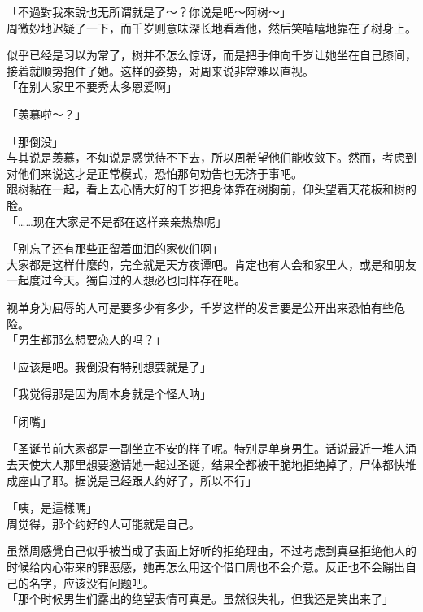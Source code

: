 「不過對我來說也无所谓就是了～？你说是吧～阿树～」\\

周微妙地迟疑了一下，而千岁则意味深长地看着他，然后笑嘻嘻地靠在了树身上。

似乎已经是习以为常了，树并不怎么惊讶，而是把手伸向千岁让她坐在自己膝间，接着就顺势抱住了她。这样的姿势，对周来说非常难以直视。\\

「在别人家里不要秀太多恩爱啊」

「羡慕啦～？」

「那倒没」\\

与其说是羡慕，不如说是感觉待不下去，所以周希望他们能收敛下。然而，考虑到对他们来说这才是正常模式，恐怕那句劝告也无济于事吧。\\

跟树黏在一起，看上去心情大好的千岁把身体靠在树胸前，仰头望着天花板和树的脸。\\

「……现在大家是不是都在这样亲亲热热呢」

「别忘了还有那些正留着血泪的家伙们啊」\\

大家都是这样什麼的，完全就是天方夜谭吧。肯定也有人会和家里人，或是和朋友一起度过今天。獨自过的人想必也同样存在吧。

视单身为屈辱的人可是要多少有多少，千岁这样的发言要是公开出来恐怕有些危险。\\

「男生都那么想要恋人的吗？」

「应该是吧。我倒没有特别想要就是了」

「我觉得那是因为周本身就是个怪人呐」

「闭嘴」

「圣诞节前大家都是一副坐立不安的样子呢。特别是单身男生。话说最近一堆人涌去天使大人那里想要邀请她一起过圣诞，结果全都被干脆地拒绝掉了，尸体都快堆成座山了耶。据说是已经跟人约好了，所以不行」

「咦，是這樣嗎」\\%

周觉得，那个约好的人可能就是自己。

虽然周感覺自己似乎被当成了表面上好听的拒绝理由，不过考虑到真昼拒绝他人的时候给内心带来的罪恶感，她再怎么用这个借口周也不会介意。反正也不会蹦出自己的名字，应该没有问题吧。\\%

「那个时候男生们露出的绝望表情可真是。虽然很失礼，但我还是笑出来了」

